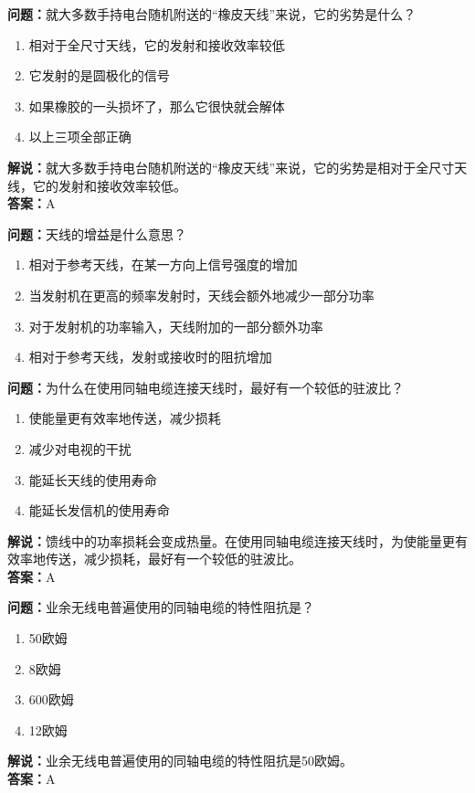 \documentclass{ctexbook}%
\begin{document}
\textbf{问题：}就大多数手持电台随机附送的“橡皮天线”来说，它的劣势是什么？
\begin{enumerate}[label=\Alph*), leftmargin=3em]
\item 相对于全尺寸天线，它的发射和接收效率较低
\item 它发射的是圆极化的信号
\item 如果橡胶的一头损坏了，那么它很快就会解体
\item 以上三项全部正确
\end{enumerate}
\textbf{解说：}就大多数手持电台随机附送的“橡皮天线”来说，它的劣势是相对于全尺寸天线，它的发射和接收效率较低。\\
\textbf{答案：}A

\textbf{问题：}天线的增益是什么意思？
\begin{enumerate}[label=\Alph*), leftmargin=3em]
\item 相对于参考天线，在某一方向上信号强度的增加
\item 当发射机在更高的频率发射时，天线会额外地减少一部分功率
\item 对于发射机的功率输入，天线附加的一部分额外功率
\item 相对于参考天线，发射或接收时的阻抗增加
\end{enumerate}

\textbf{问题：}为什么在使用同轴电缆连接天线时，最好有一个较低的驻波比？
\begin{enumerate}[label=\Alph*), leftmargin=3em]
\item 使能量更有效率地传送，减少损耗
\item 减少对电视的干扰
\item 能延长天线的使用寿命
\item 能延长发信机的使用寿命
\end{enumerate}
\textbf{解说：}馈线中的功率损耗会变成热量。在使用同轴电缆连接天线时，为使能量更有效率地传送，减少损耗，最好有一个较低的驻波比。\\
\textbf{答案：}A

\textbf{问题：}业余无线电普遍使用的同轴电缆的特性阻抗是？
\begin{enumerate}[label=\Alph*), leftmargin=3em]
\item 50欧姆
\item 8欧姆
\item 600欧姆
\item 12欧姆
\end{enumerate}
\textbf{解说：}业余无线电普遍使用的同轴电缆的特性阻抗是50欧姆。\\
\textbf{答案：}A
\end{document}
